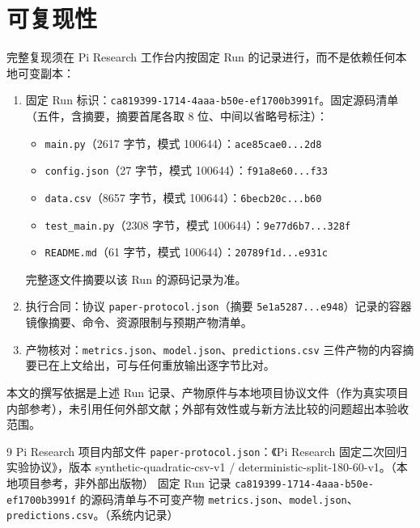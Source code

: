 \documentclass[a4paper,11pt]{article}
\begin{document}
\section{可复现性}

完整复现须在 Pi Research 工作台内按固定 Run 的记录进行，而不是依赖任何本地可变副本：
\begin{enumerate}
\item 固定 Run 标识：\texttt{ca819399-1714-4aaa-}\allowbreak\texttt{b50e-ef1700b3991f}。固定源码清单（五件，含摘要，摘要首尾各取 8 位、中间以省略号标注）：
  \begin{itemize}
  \item \texttt{main.py}（2617 字节，模式 100644）：\texttt{ace85cae0...2d8}
  \item \texttt{config.json}（27 字节，模式 100644）：\texttt{f91a8e60...f33}
  \item \texttt{data.csv}（8657 字节，模式 100644）：\texttt{6becb20c...b60}
  \item \texttt{test\_main.py}（2308 字节，模式 100644）：\texttt{9e77d6b7...328f}
  \item \texttt{README.md}（61 字节，模式 100644）：\texttt{20789f1d...e931c}
  \end{itemize}
  完整逐文件摘要以该 Run 的源码记录为准。
\item 执行合同：协议 \texttt{paper-protocol.json}（摘要 \texttt{5e1a5287...e948}）记录的容器镜像摘要、命令、资源限制与预期产物清单。
\item 产物核对：\texttt{metrics.json}、\texttt{model.json}、\texttt{predictions.csv} 三件产物的内容摘要已在上文给出，可与任何重放输出逐字节比对。
\end{enumerate}
本文的撰写依据是上述 Run 记录、产物原件与本地项目协议文件（作为真实项目内部参考），未引用任何外部文献；外部有效性或与新方法比较的问题超出本验收范围。

\begin{thebibliography}{9}
 Pi Research 项目内部文件 \texttt{paper-protocol.json}：《Pi Research 固定二次回归实验协议》，版本 synthetic-quadratic-csv-v1 / deterministic-split-180-60-v1。（本地项目参考，非外部出版物）
 固定 Run 记录 \texttt{ca819399-1714-4aaa-}\allowbreak\texttt{b50e-ef1700b3991f} 的源码清单与不可变产物 \texttt{metrics.json}、\texttt{model.json}、\texttt{predictions.csv}。（系统内记录）
\end{thebibliography}
\end{document}
